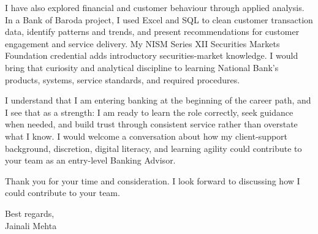 \documentclass[letterpaper,11pt]{article}
\begin{document}
\bigbreak
I have also explored financial and customer behaviour through applied analysis. In a Bank of Baroda project, I used Excel and SQL to clean customer transaction data, identify patterns and trends, and present recommendations for customer engagement and service delivery. My NISM Series XII Securities Markets Foundation credential adds introductory securities-market knowledge. I would bring that curiosity and analytical discipline to learning National Bank's products, systems, service standards, and required procedures.

\bigbreak
I understand that I am entering banking at the beginning of the career path, and I see that as a strength: I am ready to learn the role correctly, seek guidance when needed, and build trust through consistent service rather than overstate what I know. I would welcome a conversation about how my client-support background, discretion, digital literacy, and learning agility could contribute to your team as an entry-level Banking Advisor.

\bigbreak
Thank you for your time and consideration. I look forward to discussing how I could contribute to your team.

\bigbreak
Best regards,\\
Jainali Mehta
\end{document}
